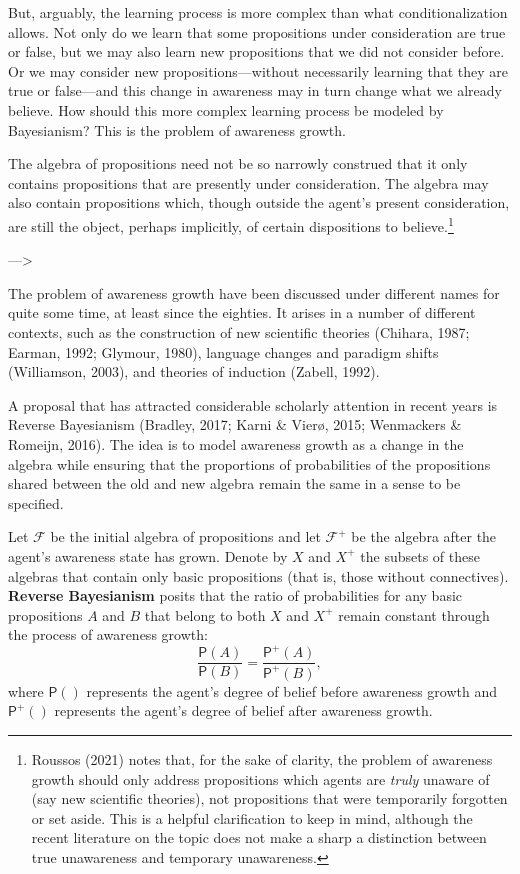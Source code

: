 \documentclass[
  11pt,
  dvipsnames,enabledeprecatedfontcommands, todos]{scrartcl}
\newcommand{\pr}[1]{\ensuremath{\mathsf{P}(#1)}}
\newcommand{\ppr}[2]{\ensuremath{\mathsf{P}^{#1}(#2)}}
\begin{document}
But, arguably, the learning process is more complex than what
conditionalization allows. Not only do we learn that some propositions
under consideration are true or false, but we may also learn new
propositions that we did not consider before. Or we may consider new
propositions---without necessarily learning that they are true or
false---and this change in awareness may in turn change what we already
believe. How should this more complex learning process be modeled by
Bayesianism? This is the problem of awareness growth.

The algebra of propositions need not be so narrowly construed that it
only contains propositions that are presently under consideration. The
algebra may also contain propositions which, though outside the agent's
present consideration, are still the object, perhaps implicitly, of
certain dispositions to believe.\footnote{Roussos (2021) notes that, for
  the sake of clarity, the problem of awareness growth should only
  address propositions which agents are \emph{truly} unaware of (say new
  scientific theories), not propositions that were temporarily forgotten
  or set aside. This is a helpful clarification to keep in mind,
  although the recent literature on the topic does not make a sharp a
  distinction between true unawareness and temporary unawareness.}


---\textgreater{}

The problem of awareness growth have been discussed under different
names for quite some time, at least since the eighties. It arises in a
number of different contexts, such as the construction of new scientific
theories (Chihara, 1987; Earman, 1992; Glymour, 1980), language changes
and paradigm shifts (Williamson, 2003), and theories of induction
(Zabell, 1992).

A proposal that has attracted considerable scholarly attention in recent
years is Reverse Bayesianism (Bradley, 2017; Karni \& Vierø, 2015;
Wenmackers \& Romeijn, 2016). The idea is to model awareness growth as a
change in the algebra while ensuring that the proportions of
probabilities of the propositions shared between the old and new algebra
remain the same in a sense to be specified.

Let \(\mathcal{F}\) be the initial algebra of propositions and let
\(\mathcal{F}^+\) be the algebra after the agent's awareness state has
grown.
Denote by \(X\) and \(X^+\) the subsets of these algebras that contain
only basic propositions (that is, those without connectives).
\textbf{Reverse Bayesianism} posits that the ratio of probabilities for
any basic propositions \(A\) and \(B\) that belong to both \(X\) and
\(X^+\) remain constant through the process of awareness growth:
\[\frac{\pr{A}}{\pr{B}} = \frac{\ppr{+}{A}}{\ppr{+}{B}},\] where
\(\pr{}\) represents the agent's degree of belief before awareness
growth and \(\ppr{+}{}\) represents the agent's degree of belief after
awareness growth.
\end{document}
